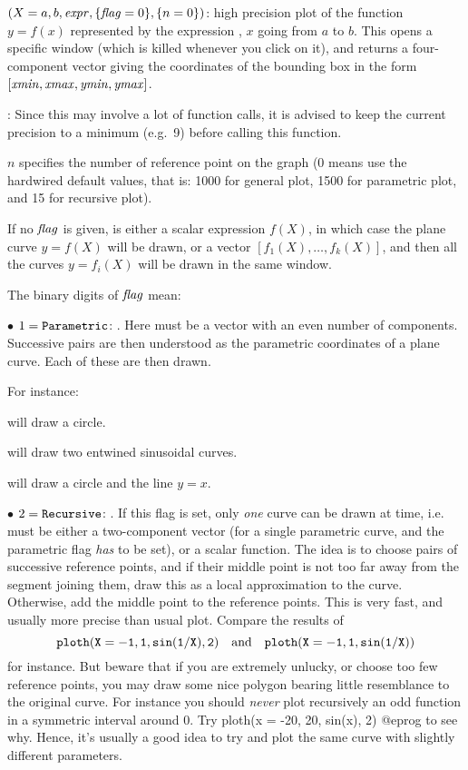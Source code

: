 $(X=a,b,\hbox{\it expr\/},\{\hbox{\it f\kern0pt lag\/}=0\},\{n=0\})$: high precision
plot of the function $y=f(x)$ represented by the expression , $x$
going from $a$ to $b$. This opens a specific window (which is killed
whenever you click on it), and returns a four-component vector giving the
coordinates of the bounding box in the form
$[\hbox{\it xmin\/},\hbox{\it xmax\/},\hbox{\it ymin\/},\hbox{\it ymax\/}]$.

: Since this may involve a lot of function calls,
it is advised to keep the current precision to a minimum (e.g.~9) before
calling this function.

$n$ specifies the number of reference point on the graph (0 means use the
hardwired default values, that is: 1000 for general plot, 1500 for
parametric plot, and 15 for recursive plot).

If no $\hbox{\it f\kern0pt lag\/}$ is given,  is either a scalar expression $f(X)$, in which
case the plane curve $y=f(X)$ will be drawn, or a vector
$[f_1(X),\dots,f_k(X)]$, and then all the curves $y=f_i(X)$ will be drawn in
the same window.

\noindent The binary digits of $\hbox{\it f\kern0pt lag\/}$ mean:

$\bullet$ $1 = {\tt Parametric}$: . Here  must
be a vector with an even number of components. Successive pairs are then
understood as the parametric coordinates of a plane curve. Each of these are
then drawn.

For instance:

 will draw a circle.

 will draw two entwined sinusoidal
curves.

 will draw a circle and the line
$y=x$.


$\bullet$ $2 = {\tt Recursive}$: . If this flag is set,
only \emph{one} curve can be drawn at time, i.e.~ must be either a
two-component vector (for a single parametric curve, and the parametric flag
\emph{has} to be set), or a scalar function. The idea is to choose pairs of
successive reference points, and if their middle point is not too far away
from the segment joining them, draw this as a local approximation to the
curve. Otherwise, add the middle point to the reference points. This is very
fast, and usually more precise than usual plot. Compare the results of
$${\tt ploth(X=-1,1,sin(1/X),2)}\quad
 {\rm and}\quad{\tt ploth(X=-1,1,sin(1/X))}$$
for instance. But beware that if you are extremely unlucky, or choose too few
reference points, you may draw some nice polygon bearing little resemblance
to the original curve. For instance you should \emph{never} plot recursively
an odd function in a symmetric interval around 0. Try
\bprog
  ploth(x = -20, 20, sin(x), 2)
@eprog
\noindent to see why. Hence, it's usually a good idea to try and plot the same
curve with slightly different parameters.

